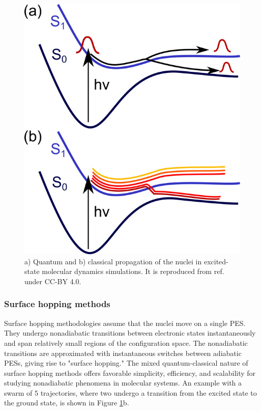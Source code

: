 \documentclass[9pt,bestpractices]{livecoms}
\begin{document}
\begin{figure}[hbt!]
\centering
\includegraphics[width=0.9\linewidth]{figures/NAMD_JW2020.jpeg}
\caption{a) Quantum and b) classical propagation of the nuclei in excited-state molecular dynamics simulations. It is reproduced from ref. \cite{RN98} under CC-BY 4.0.}
\label{fig:NAMD}
\end{figure}

\subsubsection{Surface hopping methods}
\label{sec:surfacehop}

Surface hopping methodologies assume that the nuclei move on a single PES. They undergo nonadiabatic transitions between electronic states instantaneously and span relatively small regions of the configuration space. The nonadiabatic transitions are approximated with instantaneous switches between adiabatic PESs, giving rise to "surface hopping." The mixed quantum-classical nature of surface hopping methods offers favorable simplicity, efficiency, and scalability for studying nonadiabatic phenomena in molecular systems. An example with a swarm of 5 trajectories, where two undergo a transition from the excited state to the ground state, is shown in Figure \ref{fig:NAMD}b.
\end{document}
